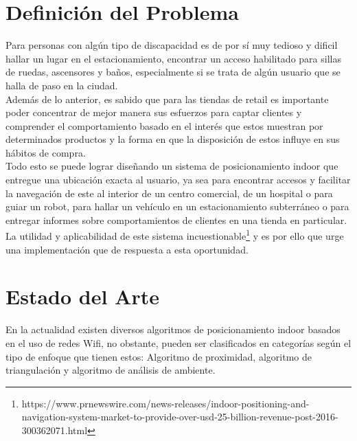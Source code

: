 \section{Definición del Problema}

Para personas con algún tipo de discapacidad es de por sí muy tedioso y dificil hallar un lugar en el estacionamiento, encontrar un acceso habilitado para sillas de ruedas, ascensores y baños, especialmente si se trata de algún usuario que se halla de paso en la ciudad.\\

Además de lo anterior, es sabido que para las tiendas de retail es importante poder concentrar de mejor manera sus esfuerzos para captar clientes y comprender el comportamiento basado en el interés que estos muestran por determinados productos y la forma en que la disposición de estos influye en sus hábitos de compra.\\

Todo esto se puede lograr diseñando un sistema de posicionamiento indoor que entregue una ubicación exacta al usuario, ya sea para encontrar accesos y facilitar la navegación de este al interior de un centro comercial, de un hospital o para guiar un robot, para hallar un vehículo en un estacionamiento subterráneo o para entregar informes sobre comportamientos de clientes en una tienda en particular.\\

La utilidad y aplicabilidad de este sistema incuestionable\footnote{https://www.prnewswire.com/news-releases/indoor-positioning-and-navigation-system-market-to-provide-over-usd-25-billion-revenue-post-2016-300362071.html} y es por ello que urge una implementación que de respuesta a esta oportunidad.

\section{Estado del Arte}

En la actualidad existen diversos algoritmos de posicionamiento indoor basados en el uso de redes Wifi, no obstante, pueden ser clasificados en categorías según el tipo de enfoque que tienen estos: Algoritmo de proximidad, algoritmo de triangulación y algoritmo de análisis de ambiente.



